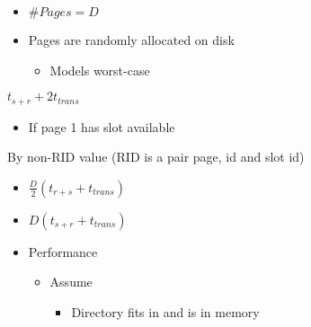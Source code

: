 \begin{itemize}
\begin{itemize}
\begin{itemize}
\begin{itemize}
\begin{itemize}
                                    \item $\# Pages = D$
                                    \item Pages are randomly allocated on disk
                                        \begin{itemize}
                                            \item Models worst-case
                                        \end{itemize}
                                \end{itemize}
                             $t_{s + r}  + 2 t_{trans}$
                                \begin{itemize}
                                    \item If page 1 has slot available
                                \end{itemize}
                             By non-RID value (RID is a pair page, id and slot id)
                                \begin{itemize}
                                    \item $\frac{D}{2}(t_{r+s} + t_{trans})$
                                \end{itemize}
                                \begin{itemize}
                                    \item $D(t_{s+r} + t_{trans})$
                                \end{itemize}
                        \end{itemize}
                \end{itemize}
                \begin{itemize}
                     Multiple pages
                        \begin{itemize}
                            \item Each contains a list of pointer to data pages
                        \end{itemize}
                    \item Performance
                        \begin{itemize}
                            \item Assume
                                \begin{itemize}
                                    \item Directory fits in and is in memory

\end{itemize}
\end{itemize}
\end{itemize}
\end{itemize}
\end{itemize}
